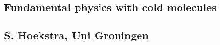 \subsection*{Fundamental physics with cold molecules}
\subsection*{S. Hoekstra, Uni Groningen}
\noindent

